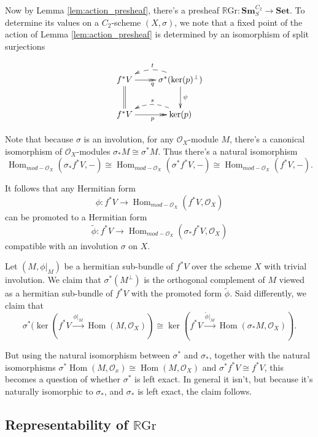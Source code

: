 \documentclass[draftthesis,tocnosub,noragright,centerchapter,10pt]{uiucthesis2009}
\newcommand{\mc}{\mathcal}
\newcommand{\RGr}{\mathbb R\mathrm{Gr}}
\newcommand{\Set}{\mathbf{Set}}
\newcommand{\Sm}[1]{\mathbf{Sm}_{#1}}
\DeclareMathOperator{\Hom}{Hom}
\theoremstyle{plain}
\theoremstyle{definition}
\begin{document}
Now by Lemma \ref{lem:action_presheaf}, there's a presheaf $\RGr :
\Sm{S}^{C_2} \rightarrow \Set$. To determine its values on a
$C_2$-scheme $(X,\sigma)$, we note that a fixed point of the action of Lemma
\ref{lem:action_presheaf} is determined by an isomorphism of split
surjections

\[
\xymatrix{f^*V \ar@{>>}[r]_q \ar@{=}[d]& \ar@/_1.0pc/@{-->}[l]_t\sigma^*(\ker(p)^\perp) \ar[d]^\psi\\
f^*V \ar@{>>}[r]_{p} & \ar@/_1.0pc/@{-->}[l]_{s}\ker(p)}
\]

Note that because $\sigma$ is an involution, for any $\mc O_X$-module
$M$, there's a canonical isomorphism of $\mc O_X$-modules $\sigma_*M \cong
\sigma^*M$. Thus there's a natural isomorphism 
\[
\Hom_{mod-\mc
  O_X}(\sigma_*f^*V,-) \cong \Hom_{mod-\mc O_X}(\sigma^*f^*V,-) \cong
\Hom_{mod-\mc O_X}(f^*V,-).
\]

It follows that any Hermitian form
\[
\phi : f^*V \rightarrow \Hom_{mod-\mc O_X}(f^*V,\mc O_X)
\]
can be promoted to a Hermitian form
\[
\widetilde\phi : f^*V \rightarrow \Hom_{mod-\mc O_X}(\sigma_*f^*V,\mc O_X)
\]
compatible with an involution $\sigma$ on $X$.

Let $(M,\phi|_M)$ be a hermitian sub-bundle of $f^*V$ over the scheme $X$ with
trivial involution. We claim that $\sigma^*(M^\perp)$ is the
orthogonal complement of $M$ viewed as a hermitian sub-bundle of
$f^*V$ with the promoted form $\widetilde \phi$. Said differently, we
claim that
\[
\sigma^*(\ker(f^*V \xrightarrow{\phi|_M} \Hom(M,\mc O_X)) \cong \ker(f^*V
\xrightarrow{\widetilde \phi|_M} \Hom(\sigma_*M,\mc O_X)).
\]

But using the natural isomorphism between $\sigma^*$ and $\sigma_*$,
together with the natural isomorphisms $\sigma^*\Hom(M,\mc O_x) \cong
\Hom(M,\mc O_X)$ and $\sigma^*f^*V \cong f^*V$, this becomes a question
of whether $\sigma^*$ is left exact. In general it isn't, but because
it's naturally isomorphic to $\sigma_*$, and $\sigma_*$ is left exact, the claim
follows. 



\subsection{Representability of $\RGr$}
\end{document}
